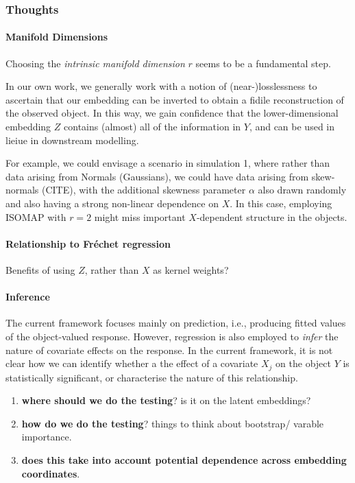 \subsubsection*{Thoughts}

\paragraph*{Manifold Dimensions}

Choosing the \emph{intrinsic manifold dimension} $r$ seems to be a fundamental step. 

In our own work, we generally work with a notion of (near-)losslessness to ascertain that our embedding can be inverted to obtain a fidile reconstruction of the observed object.
In this way, we gain confidence that the lower-dimensional embedding $Z$ contains (almost) all of the information in $Y$, and can be used in lieiue in downstream modelling.

For example, we could envisage a scenario in simulation 1, where rather than data arising from Normals (Gaussians), we could have data arising from skew-normals (CITE), with the additional skewness parameter $\alpha$ also drawn randomly and also having a strong non-linear dependence on $X$. In this case, employing ISOMAP with $r=2$ might miss important $X$-dependent structure in the objects.

\paragraph*{Relationship to Fr\'echet regression}

Benefits of using $Z$, rather than $X$ as kernel weights?

\paragraph*{Inference}

The current framework focuses mainly on prediction, i.e., producing fitted values of the object-valued response.
However, regression is also employed to \emph{infer} the nature of covariate effects on the response.
In the current framework, it is not clear how we can identify whether a the effect of a covariate $X_j$ on the object $Y$ is statistically significant, or characterise the nature of this relationship.

\begin{enumerate}
  \item \textbf{where should we do the testing}? is it on the latent embeddings? 
  \item \textbf{how do we do the testing}? things to think about bootstrap/ varable importance.
  \item \textbf{does this take into account potential dependence across embedding coordinates}.
\end{enumerate}

